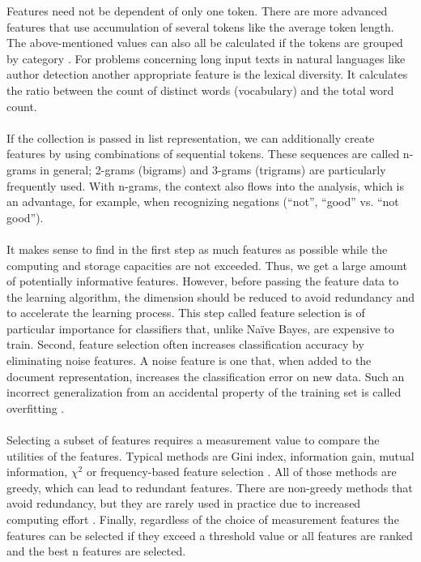 \documentclass[article,type=msc,colorback,accentcolor=tud7b]{tudthesis}
\begin{document}
    Features need not be dependent of only one token. There are more advanced features that use accumulation of several tokens like the average token length. The above-mentioned values can also all be calculated if the tokens are grouped by category \autocite{Wang2010}. For problems concerning long input texts in natural languages like author detection another appropriate feature is the lexical diversity. It calculates the ratio between the count of distinct words (vocabulary) and the total word count. \\\\
    If the collection is passed in list representation, we can additionally create features by using combinations of sequential tokens. These sequences are called n-grams in general; 2-grams (bigrams) and 3-grams (trigrams) are particularly frequently used. With n-grams, the context also flows into the analysis, which is an advantage, for example, when recognizing negations (“not”, “good” vs. “not good”). \\\\
    It makes sense to find in the first step as much features as possible while the computing and storage capacities are not exceeded. Thus, we get a large amount of potentially informative features. However, before passing the feature data to the learning algorithm, the dimension should be reduced to avoid redundancy and to accelerate the learning process. This step called feature selection is of particular importance for classifiers that, unlike Naïve Bayes, are expensive to train. Second, feature selection often increases classification accuracy by eliminating noise features. A noise feature is one that, when added to the document representation, increases the classification error on new data. Such an incorrect generalization from an accidental property of the training set is called overfitting \autocite[Chapter~13.5]{Manning2008}. \\\\
    Selecting a subset of features requires a measurement value to compare the utilities of the features. Typical methods are Gini index, information gain, mutual information, $\chi^2$ or frequency-based feature selection \autocite[Chapter~2.1]{Aggarwal2012}. All of those methods are greedy, which can lead to redundant features. There are non-greedy methods that avoid redundancy, but they are rarely used in practice due to increased computing effort \autocite[Chapter~13.5]{Manning2008}. Finally, regardless of the choice of measurement features the features can be selected if they exceed a threshold value or all features are ranked and the best n features are selected. \\\\
\end{document}
